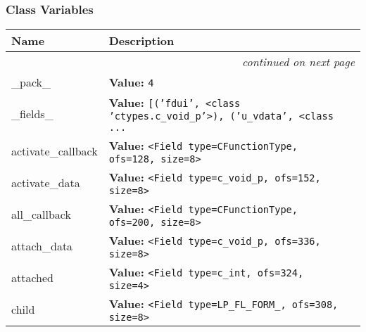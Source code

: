 
  \subsubsection{Class Variables}

    \vspace{-1cm}
\hspace{\varindent}\begin{longtable}{|p{\varnamewidth}|p{\vardescrwidth}|l}
\cline{1-2}
\cline{1-2} \centering \textbf{Name} & \centering \textbf{Description}& \\
\cline{1-2}
\endhead\cline{1-2}\multicolumn{3}{r}{\small\textit{continued on next page}}\\\endfoot\cline{1-2}
\endlastfoot\raggedright \_\-p\-a\-c\-k\-\_\- & \raggedright \textbf{Value:} 
{\tt 4}&\\
\cline{1-2}
\raggedright \_\-f\-i\-e\-l\-d\-s\-\_\- & \raggedright \textbf{Value:} 
{\tt \texttt{[}\texttt{(}\texttt{'}\texttt{fdui}\texttt{'}\texttt{, }{\textless}class 'ctypes.c\_void\_p'{\textgreater}\texttt{)}\texttt{, }\texttt{(}\texttt{'}\texttt{u\_vdata}\texttt{'}\texttt{, }{\textless}class \texttt{...}}&\\
\cline{1-2}
\raggedright a\-c\-t\-i\-v\-a\-t\-e\-\_\-c\-a\-l\-l\-b\-a\-c\-k\- & \raggedright \textbf{Value:} 
{\tt {\textless}Field type=CFunctionType, ofs=128, size=8{\textgreater}}&\\
\cline{1-2}
\raggedright a\-c\-t\-i\-v\-a\-t\-e\-\_\-d\-a\-t\-a\- & \raggedright \textbf{Value:} 
{\tt {\textless}Field type=c\_void\_p, ofs=152, size=8{\textgreater}}&\\
\cline{1-2}
\raggedright a\-l\-l\-\_\-c\-a\-l\-l\-b\-a\-c\-k\- & \raggedright \textbf{Value:} 
{\tt {\textless}Field type=CFunctionType, ofs=200, size=8{\textgreater}}&\\
\cline{1-2}
\raggedright a\-t\-t\-a\-c\-h\-\_\-d\-a\-t\-a\- & \raggedright \textbf{Value:} 
{\tt {\textless}Field type=c\_void\_p, ofs=336, size=8{\textgreater}}&\\
\cline{1-2}
\raggedright a\-t\-t\-a\-c\-h\-e\-d\- & \raggedright \textbf{Value:} 
{\tt {\textless}Field type=c\_int, ofs=324, size=4{\textgreater}}&\\
\cline{1-2}
\raggedright c\-h\-i\-l\-d\- & \raggedright \textbf{Value:} 
{\tt {\textless}Field type=LP\_FL\_FORM\_, ofs=308, size=8{\textgreater}}&\\

\end{longtable}

